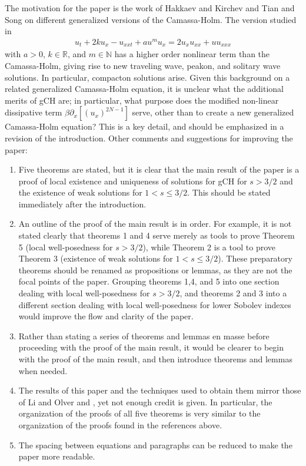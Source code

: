 \documentclass[12pt,reqno]{amsart}
\newcommand{\rr}{\mathbb{R}}
\newcommand{\p}{\partial}
\theoremstyle{plain}  %
\begin{document}
The motivation for the paper is the work
of Hakkaev and Kirchev \cite{Hakkaev_Kirchev-Local-well-pose} and 
Tian and Song \cite{Tian_Song-New-peaked-soli} on different generalized 
versions of the Camassa-Holm. The version studied in 
\cite{Tian_Song-New-peaked-soli}
%
%
\begin{equation*}
	\begin{split}
		u_t + 2ku_x -u_{xxt} + au^m u_x = 2u_x u_{xx} + u u_{xxx}
	\end{split}
\end{equation*}
%
%
with $a > 0$, $k \in \rr$, and $m \in \mathbb{N}$ has a higher order nonlinear term  
than the Camassa-Holm, giving rise to new traveling wave, peakon, and 
solitary wave solutions. In particular, compacton solutions arise. 
Given this background on a related generalized Camassa-Holm equation, it is unclear 
what the additional merits of gCH are; in particular,  
what purpose does the modified non-linear dissipative term $\beta \p_x 
[(u_x)^{2N-1}]$
serve, other than to create a new generalized Camassa-Holm equation? This 
is a key detail, and should be emphasized in a revision of the 
introduction. Other comments and suggestions for improving the paper:
%
%
\begin{enumerate}
	\item Five theorems are stated, but it is clear that the main result of 
		the paper is a proof of local existence and uniqueness of solutions 
		for gCH for $s > 3/2$ 
		and the existence of weak solutions for $1 < s \le 3/2$. This 
		should be stated immediately after the introduction. 
	\item An outline of the proof of the main result is in order.
		For example, it is not stated clearly 
		that theorems 1 and 4
		serve merely as tools to prove Theorem 5 (local well-posedness for $s 
		> 3/2$), while Theorem 2 is a tool to prove Theorem 3 (existence of weak 
		solutions for $1 < s \le 3/2$). These preparatory theorems should be 
		renamed as propositions or lemmas, as they are not the focal 
		points of the paper. Grouping theorems 1,4, and 5 into one section   
		dealing with local well-posedness for $s >3/2$, and theorems 2 and 
		3 into a different section dealing with local well-posedness for 
		lower Sobolev indexes would improve the flow and clarity of the 
		paper.
	\item Rather than stating a series of theorems and lemmas en masse 
		before proceeding with the proof of the main result, it would be 
		clearer to begin with the proof of the main result, and then 
		introduce theorems and lemmas when needed. 
	\item The results of this paper and the techniques used to obtain them
		mirror those of Li and Olver 
		\cite{Li_2000_Well-posedness-} and 
		\cite{Hakkaev_Kirchev-Local-well-pose}, 
		yet not enough credit is given. In particular, the organization of 
		the proofs of all five theorems is very similar to the organization
		of the proofs found 
		in the references above. 
	\item The spacing between equations and paragraphs can be reduced to 
		make the paper more readable.

\end{enumerate}
		
\end{document}
